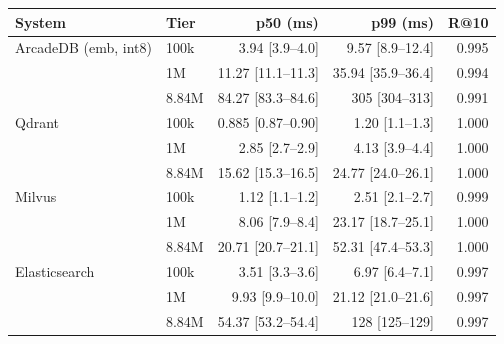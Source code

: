 \begin{tabular}{llrrr}
\toprule
System & Tier & p50 (ms) & p99 (ms) & R@10 \\
\midrule
ArcadeDB (emb, int8) & 100k & 3.94 [3.9--4.0] & 9.57 [8.9--12.4] & 0.995 \\
 & 1M & 11.27 [11.1--11.3] & 35.94 [35.9--36.4] & 0.994 \\
 & 8.84M & 84.27 [83.3--84.6] & 305 [304--313] & 0.991 \\
\addlinespace
Qdrant & 100k & 0.885 [0.87--0.90] & 1.20 [1.1--1.3] & 1.000 \\
 & 1M & 2.85 [2.7--2.9] & 4.13 [3.9--4.4] & 1.000 \\
 & 8.84M & 15.62 [15.3--16.5] & 24.77 [24.0--26.1] & 1.000 \\
\addlinespace
Milvus & 100k & 1.12 [1.1--1.2] & 2.51 [2.1--2.7] & 0.999 \\
 & 1M & 8.06 [7.9--8.4] & 23.17 [18.7--25.1] & 1.000 \\
 & 8.84M & 20.71 [20.7--21.1] & 52.31 [47.4--53.3] & 1.000 \\
\addlinespace
Elasticsearch & 100k & 3.51 [3.3--3.6] & 6.97 [6.4--7.1] & 0.997 \\
 & 1M & 9.93 [9.9--10.0] & 21.12 [21.0--21.6] & 0.997 \\
 & 8.84M & 54.37 [53.2--54.4] & 128 [125--129] & 0.997 \\
\bottomrule
\end{tabular}
